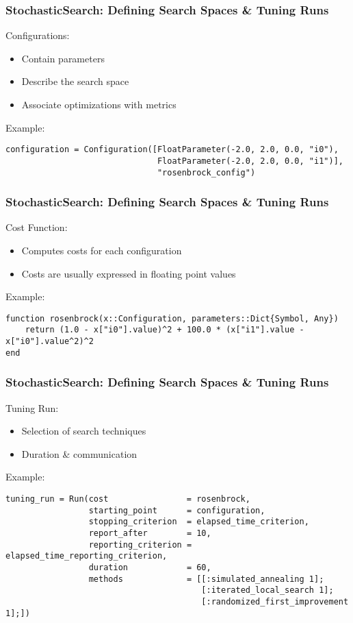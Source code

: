 \documentclass[10pt, compress, aspectratio=169, xcolor=table]{beamer}
\begin{document}
\begin{frame}[fragile]
    \frametitle{StochasticSearch: Defining Search Spaces \& Tuning Runs}
    \alert{Configurations}:
    \begin{itemize}
        \item Contain \alert{parameters}
        \item Describe the \alert{search space}
        \item Associate \alert{optimizations} with \alert{metrics}
    \end{itemize}

    \pause

    Example:
    \begin{lstlisting}
configuration = Configuration([FloatParameter(-2.0, 2.0, 0.0, "i0"),
                               FloatParameter(-2.0, 2.0, 0.0, "i1")],
                               "rosenbrock_config")
    \end{lstlisting}
\end{frame}

\begin{frame}[fragile]
    \frametitle{StochasticSearch: Defining Search Spaces \& Tuning Runs}
    \alert{Cost Function}:
    \begin{itemize}
        \item Computes \alert{costs} for each \alert{configuration}
        \item \alert{Costs} are usually expressed in \alert{floating point values}
    \end{itemize}

    \pause

    Example:
    \begin{lstlisting}
function rosenbrock(x::Configuration, parameters::Dict{Symbol, Any})
    return (1.0 - x["i0"].value)^2 + 100.0 * (x["i1"].value - x["i0"].value^2)^2
end
    \end{lstlisting}
\end{frame}

\begin{frame}[fragile]
    \frametitle{StochasticSearch: Defining Search Spaces \& Tuning Runs}
    \alert{Tuning Run}:
    \begin{itemize}
        \item Selection of \alert{search techniques}
        \item \alert{Duration} \& \alert{communication}
    \end{itemize}

    \pause

    Example:
    \begin{lstlisting}
tuning_run = Run(cost                = rosenbrock,
                 starting_point      = configuration,
                 stopping_criterion  = elapsed_time_criterion,
                 report_after        = 10,
                 reporting_criterion = elapsed_time_reporting_criterion,
                 duration            = 60,
                 methods             = [[:simulated_annealing 1];
                                        [:iterated_local_search 1];
                                        [:randomized_first_improvement 1];])
    \end{lstlisting}
\end{frame}
\end{document}
